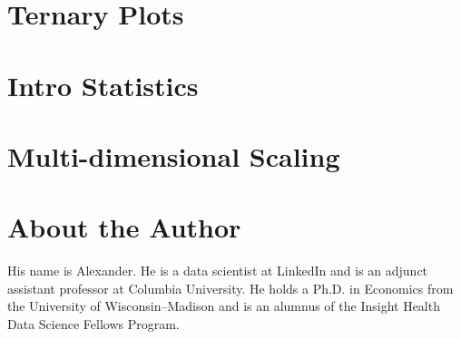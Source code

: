 \documentclass{tex/kdp} %
\begin{document}
\chapter{Ternary Plots}\label{chapter:ternary}


\chapter{Intro Statistics}\label{chapter:stats}


\chapter{Multi-dimensional Scaling}\label{chapter:mds}




\backmatter
\printbibliography
\chapter*{About the Author}
His name is Alexander. He is a data scientist at LinkedIn and is an adjunct assistant professor at Columbia University. He holds a Ph.D. in Economics from the University of Wisconsin–Madison and is an alumnus of the Insight Health Data Science Fellows Program. \faHandPeaceO
\end{document}
